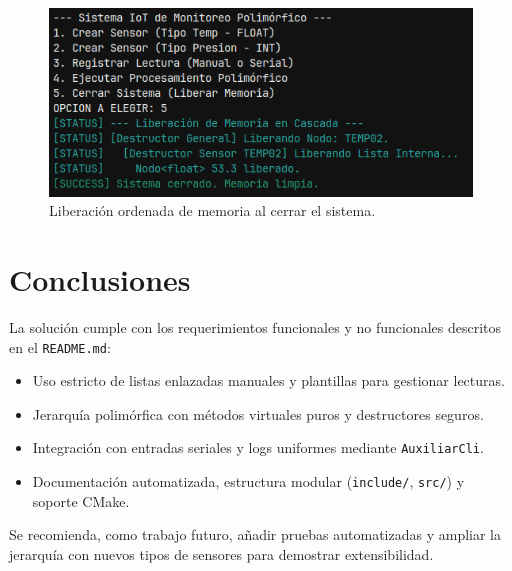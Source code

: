 \documentclass[11pt,a4paper]{article}
\begin{document}
\begin{figure}[h]
    \centering
    \includegraphics[width=0.8\linewidth]{salirDelPrograma.png}
    \caption{Liberación ordenada de memoria al cerrar el sistema.}
    \label{fig:salir}
\end{figure}

\clearpage

\section{Conclusiones}

La solución cumple con los requerimientos funcionales y no funcionales descritos en el \texttt{README.md}:
\begin{itemize}[leftmargin=1.5em]
    \item Uso estricto de listas enlazadas manuales y plantillas para gestionar lecturas.
    \item Jerarquía polimórfica con métodos virtuales puros y destructores seguros.
    \item Integración con entradas seriales y logs uniformes mediante \texttt{AuxiliarCli}.
    \item Documentación automatizada, estructura modular (\texttt{include/}, \texttt{src/}) y soporte CMake.
\end{itemize}

Se recomienda, como trabajo futuro, añadir pruebas automatizadas y ampliar la jerarquía con nuevos tipos de sensores para demostrar extensibilidad.
\end{document}
